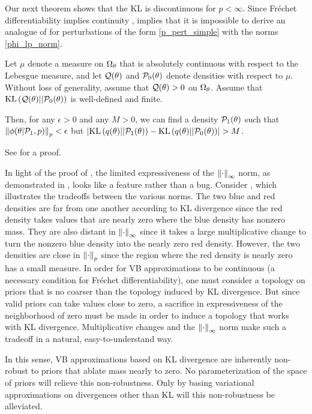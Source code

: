Our next theorem shows that the KL is discontinuous for $p < \infty$.
Since Fr{\'e}chet differentiability implies continuity \citep[Proposition 4.8
(d)]{zeidler:2013:functional},  implies that it is
impossible to derive an analogue of  for perturbations of
the form \eqref{p_pert_simple} with the norms \eqref{phi_lp_norm}.
%
\begin{thm}
%
Let $\mu$ denote a measure on $\Omega_{\theta}$ that is absolutely continuous
with respect to the Lebesgue measure, and let $\mathcal{Q}(\theta)$ and
$\mathcal{P}_{0}(\theta)$ denote densities with respect to $\mu$.  Without loss of
generality, assume that $\mathcal{Q}(\theta) > 0$ on $\Omega_{\theta}$.  Assume that
$\mathrm{KL}\left(\mathcal{Q}(\theta) || \mathcal{P}_{0}(\theta)\right)$ is well-defined and finite.

Then, for any $\epsilon > 0$ and any $M > 0$, we can find a density
$\mathcal{P}_{1}(\theta)$ such that $\left\Vert\phi(\theta \vert \mathcal{P}_{1}, p)\right\Vert_p < \epsilon$ but
$\left|\mathrm{KL}\left(q(\theta) || \mathcal{P}_{1}(\theta)\right) - \mathrm{KL}\left(q(\theta) || \mathcal{P}_{0}(\theta)\right)\right| > M$.
%
\end{thm}
%
See  for a proof.

In light of the proof of , the limited
expressiveness of the $\left\Vert\cdot\right\Vert_{\infty}$ norm, as demonstrated in
, looks like a feature rather than a bug.
Consider , which illustrates the tradeoffs between
the various norms.  The two blue and red densities are far from one another according
to KL divergence since the red density takes values that are
nearly zero where the blue density has nonzero mass. They are also distant in
$\left\Vert\cdot\right\Vert_{\infty}$ since it takes a large multiplicative change
to turn the nonzero blue density into the nearly zero red density. However, the
two densities are close in $\left\Vert\cdot\right\Vert_{p}$ since the region where the red
density is nearly zero has a small measure. In order for VB approximations to be
continuous (a necessary condition for Fr{\'e}chet differentiability), one must
consider a topology on priors that is no coarser than the topology induced by KL
divergence.  But since valid priors can take values close to zero, a sacrifice
in expressiveness of the neighborhood of zero must be made in order to induce a
topology that works with KL divergence. Multiplicative changes and the
$\left\Vert\cdot\right\Vert_{\infty}$ norm make such a tradeoff in a natural, easy-to-understand
way.

\FunctionDistFig{}

In this sense, VB approximations based on KL divergence are inherently
non-robust to priors that ablate mass nearly to zero.  No parameterization of
the space of priors will relieve this non-robustness.  Only by basing
variational approximations on divergences other than KL will this non-robustness
be alleviated.
